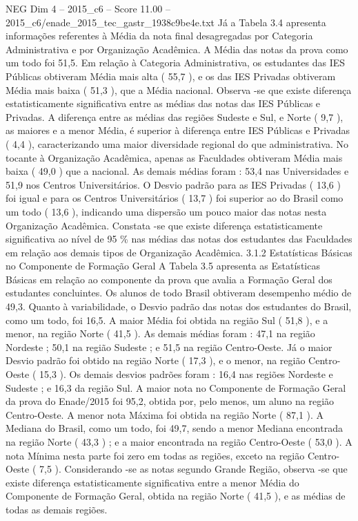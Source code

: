 \begin{textsample}{NEG Dim 4 – 2015\_c6 – Score 11.00 – 2015\_c6/enade\_2015\_tec\_gastr\_1938c9be4e.txt}
Já a Tabela 3.4 apresenta informações referentes à Média da nota final desagregadas por Categoria Administrativa e por Organização Acadêmica.
A Média das notas da prova como um todo foi 51,5.
Em relação à Categoria Administrativa, os estudantes das IES Públicas obtiveram Média mais alta ( 55,7 ), e os das IES Privadas obtiveram Média mais baixa ( 51,3 ), que a Média nacional.
Observa -se que existe diferença estatisticamente significativa entre as médias das notas das IES Públicas e Privadas.
A diferença entre as médias das regiões Sudeste e Sul, e Norte ( 9,7 ), as maiores e a menor Média, é superior à diferença entre IES Públicas e Privadas ( 4,4 ), caracterizando uma maior diversidade regional do que administrativa.
No tocante à Organização Acadêmica, apenas as Faculdades obtiveram Média mais baixa ( 49,0 ) que a nacional.
As demais médias foram : 53,4 nas Universidades e 51,9 nos Centros Universitários.
O Desvio padrão para as IES Privadas ( 13,6 ) foi igual e para os Centros Universitários ( 13,7 ) foi superior ao do Brasil como um todo ( 13,6 ), indicando uma dispersão um pouco maior das notas nesta Organização Acadêmica.
Constata -se que existe diferença estatisticamente significativa ao nível de 95 \% nas médias das notas dos estudantes das Faculdades em relação aos demais tipos de Organização Acadêmica. 3.1.2 Estatísticas Básicas no Componente de Formação Geral A Tabela 3.5 apresenta as Estatísticas Básicas em relação ao componente da prova que avalia a Formação Geral dos estudantes concluintes.
Os alunos de todo Brasil obtiveram desempenho médio de 49,3.
Quanto à variabilidade, o Desvio padrão das notas dos estudantes do Brasil, como um todo, foi 16,5.
A maior Média foi obtida na região Sul ( 51,8 ), e a menor, na região Norte ( 41,5 ).
As demais médias foram : 47,1 na região Nordeste ; 50,1 na região Sudeste ; e 51,5 na região Centro-Oeste.
Já o maior Desvio padrão foi obtido na região Norte ( 17,3 ), e o menor, na região Centro-Oeste ( 15,3 ).
Os demais desvios padrões foram : 16,4 nas regiões Nordeste e Sudeste ; e 16,3 da região Sul.
A maior nota no Componente de Formação Geral da prova do Enade/2015 foi 95,2, obtida por, pelo menos, um aluno na região Centro-Oeste.
A menor nota Máxima foi obtida na região Norte ( 87,1 ).
A Mediana do Brasil, como um todo, foi 49,7, sendo a menor Mediana encontrada na região Norte ( 43,3 ) ; e a maior encontrada na região Centro-Oeste ( 53,0 ).
A nota Mínima nesta parte foi zero em todas as regiões, exceto na região Centro-Oeste ( 7,5 ).
Considerando -se as notas segundo Grande Região, observa -se que existe diferença estatisticamente significativa entre a menor Média do Componente de Formação Geral, obtida na região Norte ( 41,5 ), e as médias de todas as demais regiões.

\end{textsample}
